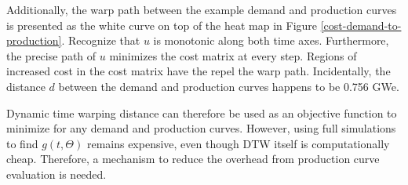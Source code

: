 Additionally, the warp path between the example demand and production 
curves is presented as the white curve on top of the heat map in 
Figure \ref{cost-demand-to-production}. 
Recognize that $u$ is monotonic along both time axes. Furthermore, the precise
path of $u$ minimizes the cost matrix at every step. Regions of increased 
cost in the cost matrix have the repel the warp path. Incidentally, the 
distance $d$ between the demand and production curves happens 
to be 0.756 GWe.

Dynamic time warping distance can therefore be used as an objective function 
to minimize for any demand and production curves. However, using full 
simulations to find $g(t, \Theta)$ remains expensive, even though DTW itself 
is computationally cheap. Therefore, a mechanism to reduce the overhead 
from production curve evaluation is needed.
